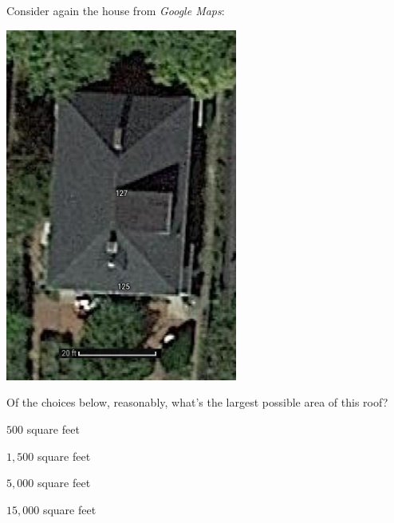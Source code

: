 \documentclass[noauthor,nooutcomes]{ximera}
\begin{document}
\begin{exercise}
  Consider again the house from \textit{Google Maps}:
  \begin{center}
    \includegraphics[width=3in]{mapsHouse.png}
  \end{center}
  Of the choices below, reasonably, what's the largest possible area of this roof?
  \begin{enumerate}\begin{multicols}{2}
    \item $500$ square feet
    \item $1,500$ square feet
    \item $5,000$ square feet
    \item $15,000$ square feet 
    \end{multicols}
  \end{enumerate}
\end{exercise}





\end{document}

